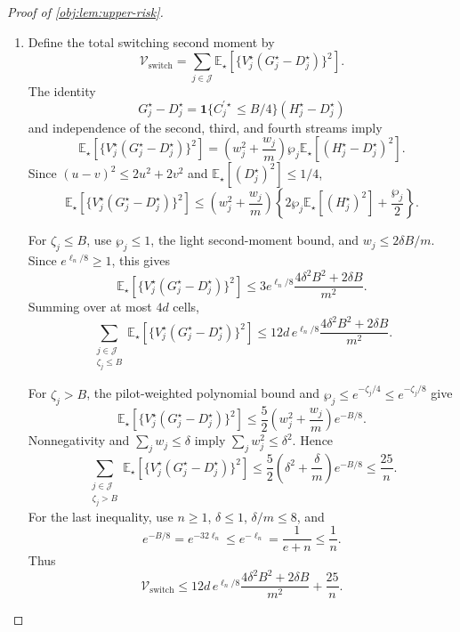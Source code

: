 \begin{proof}[Proof of \cref{obj:lem:upper-risk}]
\begin{enumerate}
The second and fourth streams are independent. Their first and second moments consequently give
\[
\begin{aligned}
\operatorname{Var}_\star(V_j^\star D_j^\star)
&=\left(w_j^2+\frac{w_j}{m}\right)
\operatorname{Var}_\star(D_j^\star)
+\frac{w_j}{m}\{\mathbb E_\star[D_j^\star]\}^2\\
&\le\frac{4w_j^2}{1+\zeta_j}
+\frac{17w_j}{4m},
\end{aligned}
\]
where \(\{\mathbb E_\star[D_j^\star]\}^2\le1/4\).
Also,
\[
\frac{w_j^2}{1+mt_j}
\le\frac{2\delta}{m}w_j,
\qquad
\sum_{j\in\mathcal J}\frac{w_j^2}{1+mt_j}
\le\frac{2\delta^2}{m}.
\]
Since \(\delta+2\delta^2\le1\),
\[
\sum_{j\in\mathcal J}
\left(\frac{w_j}{m}+\frac{w_j^2}{1+mt_j}\right)
\le\frac1m.
\]
Replacing the coefficient \(4\) of the nonnegative quadratic term by \(17/4\) therefore yields
\[
\sum_{j\in\mathcal J}
\operatorname{Var}_\star(V_j^\star D_j^\star)
\le\frac{17}{4m}
=\frac{34}{n}.
\]

\item Define the total switching second moment by
\[
\mathcal V_{\mathrm{switch}}
=
\sum_{j\in\mathcal J}
\mathbb E_\star[
\{V_j^\star(G_j^\star-D_j^\star)\}^2].
\]
The identity
\[
G_j^\star-D_j^\star
=\mathbf1\{C_j^{\prime\star}\le B/4\}(H_j^\star-D_j^\star)
\]
and independence of the second, third, and fourth streams imply
\[
\mathbb E_\star[
\{V_j^\star(G_j^\star-D_j^\star)\}^2]
=
\left(w_j^2+\frac{w_j}{m}\right)\wp_j
\mathbb E_\star[(H_j^\star-D_j^\star)^2].
\]
Since \((u-v)^2\le2u^2+2v^2\) and
\(\mathbb E_\star[(D_j^\star)^2]\le1/4\),
\[
\mathbb E_\star[
\{V_j^\star(G_j^\star-D_j^\star)\}^2]
\le
\left(w_j^2+\frac{w_j}{m}\right)
\left\{2\wp_j\mathbb E_\star[(H_j^\star)^2]+\frac{\wp_j}{2}\right\}.
\]

For \(\zeta_j\le B\), use \(\wp_j\le1\), the light second-moment bound, and
\(w_j\le2\delta B/m\). Since \(e^{\ell_n/8}\ge1\), this gives
\[
\mathbb E_\star[
\{V_j^\star(G_j^\star-D_j^\star)\}^2]
\le
3e^{\ell_n/8}
\frac{4\delta^2B^2+2\delta B}{m^2}.
\]
Summing over at most \(4d\) cells,
\[
\sum_{\substack{j\in\mathcal J\\\zeta_j\le B}}
\mathbb E_\star[
\{V_j^\star(G_j^\star-D_j^\star)\}^2]
\le
12d\,e^{\ell_n/8}
\frac{4\delta^2B^2+2\delta B}{m^2}.
\]

For \(\zeta_j>B\), the pilot-weighted polynomial bound and
\(\wp_j\le e^{-\zeta_j/4}\le e^{-\zeta_j/8}\) give
\[
\mathbb E_\star[
\{V_j^\star(G_j^\star-D_j^\star)\}^2]
\le
\frac52\left(w_j^2+\frac{w_j}{m}\right)e^{-B/8}.
\]
Nonnegativity and \(\sum_jw_j\le\delta\) imply
\(\sum_jw_j^2\le\delta^2\). Hence
\[
\sum_{\substack{j\in\mathcal J\\\zeta_j>B}}
\mathbb E_\star[
\{V_j^\star(G_j^\star-D_j^\star)\}^2]
\le\frac52\left(\delta^2+\frac{\delta}{m}\right)e^{-B/8}
\le\frac{25}{n}.
\]
For the last inequality, use \(n\ge1\), \(\delta\le1\),
\(\delta/m\le8\), and
\[
e^{-B/8}=e^{-32\ell_n}\le e^{-\ell_n}
=\frac1{e+n}\le\frac1n.
\]
Thus
\[
\mathcal V_{\mathrm{switch}}
\le
12d\,e^{\ell_n/8}
\frac{4\delta^2B^2+2\delta B}{m^2}
+\frac{25}{n}.
\]


\end{enumerate}
\end{proof}
